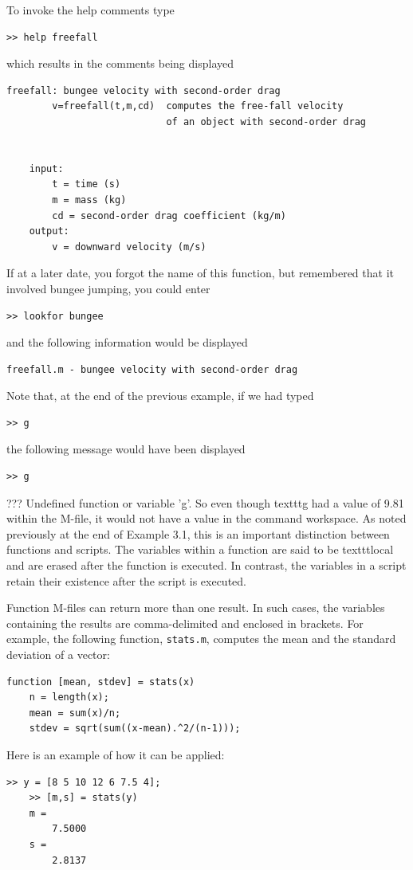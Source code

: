 \documentclass[../main.tex]{subfiles}
\begin{document}
To invoke the help comments type
\begin{lstlisting}[frame=none, numbers=none]
    >> help freefall
\end{lstlisting}

which results in the comments being displayed
\begin{lstlisting}[frame=none, numbers=none]
    freefall: bungee velocity with second-order drag
        v=freefall(t,m,cd)  computes the free-fall velocity
                            of an object with second-order drag 


    input:
        t = time (s)
        m = mass (kg)
        cd = second-order drag coefficient (kg/m)
    output:
        v = downward velocity (m/s)
\end{lstlisting}

If at a later date, you forgot the name of this function, but remembered that it involved
bungee jumping, you could enter
\begin{lstlisting}[frame=none, numbers=none]
    >> lookfor bungee
\end{lstlisting}

and the following information would be displayed
\begin{lstlisting}[frame=none, numbers=none]
    freefall.m - bungee velocity with second-order drag
\end{lstlisting}

Note that, at the end of the previous example, if we had typed
\begin{lstlisting}[frame=none, numbers=none]
    >> g
\end{lstlisting}


the following message would have been displayed
\begin{lstlisting}[frame=none, numbers=none]
    >> g
\end{lstlisting}??? Undefined function or variable 'g'.
So even though texttt{g} had a value of 9.81 within the M-file, it would not have a value in the
command workspace. As noted previously at the end of Example 3.1, this is an important
distinction between functions and scripts. The variables within a function are said to be
texttt{local} and are erased after the function is executed. In contrast, the variables in a script
retain their existence after the script is executed.


Function M-files can return more than one result. In such cases, the variables containing the results are comma-delimited and enclosed in brackets. For example, the following
function, \texttt{stats.m}, computes the mean and the standard deviation of a vector:
\begin{lstlisting}[frame=none, numbers=none]
    function [mean, stdev] = stats(x)
    n = length(x);
    mean = sum(x)/n;
    stdev = sqrt(sum((x-mean).^2/(n-1)));
\end{lstlisting}
Here is an example of how it can be applied:
\begin{lstlisting}[frame=none, numbers=none]
    >> y = [8 5 10 12 6 7.5 4];
    >> [m,s] = stats(y)
    m =
        7.5000
    s =
        2.8137
\end{lstlisting}
\end{document}
